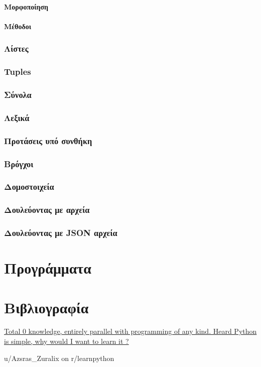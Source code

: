 \documentclass[a4paper,10pt]{report}
\begin{document}
\subsubsection{Μορφοποίηση}
\subsubsection{Μέθοδοι}
\subsection{Λίστες}
\subsection{Tuples}
\subsection{Σύνολα}
\subsection{Λεξικά}
\subsection{Προτάσεις υπό συνθήκη}
\subsection{Βρόγχοι}
\subsection{Δομοστοιχεία}
\subsection{Δουλεύοντας με αρχεία}
\subsection{Δουλεύοντας με JSON αρχεία}

\chapter{Προγράμματα}

\chapter{Βιβλιογραφία}
\epigraph{\href{https://tinyurl.com/ycnad9ch}
    {Total 0 knowledge, entirely parallel with programming of any kind.
        Heard Python is simple, why would I want to learn it ?
    }
}{u/Azsras\_Zuralix on r/learnpython}
\end{document}
